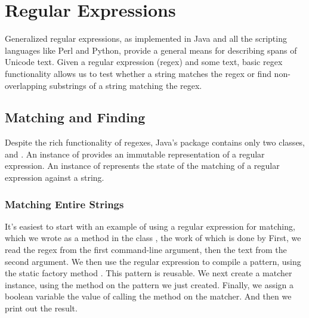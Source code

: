 \chapter{Regular Expressions}\label{chapter:regex}

Generalized regular expressions, as implemented in Java and all the
scripting languages like Perl and Python, provide a general means for
describing spans of Unicode text.  Given a regular expression (regex)
and some text, basic regex functionality allows us to test whether a
string matches the regex or find non-overlapping substrings of a
string matching the regex.

\section{Matching and Finding}

Despite the rich functionality of regexes, Java's
 package contains only two classes,
 and .  An instance of 
provides an immutable representation of a regular expression.  An
instance of  represents the state of the matching of a
regular expression against a string.

\subsection{Matching Entire Strings}

It's easiest to start with an example of using a regular expression
for matching, which we wrote as a
 method in the class , the work of
which is done by
%
%
First, we read the regex from the first command-line argument, then
the text from the second argument.  We then use the regular expression
to compile a pattern, using the static factory method
.  This pattern is reusable.  We next
create a matcher instance, using the method  on the
pattern we just created.  Finally, we assign a boolean variable
 the value of calling the method  
on the matcher.  And then we print out the result.


